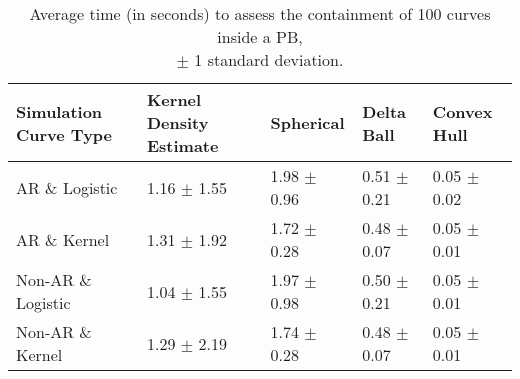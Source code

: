 \begin{table}[ht!]
\centering
\caption{Average time (in seconds) to assess the containment of 100 curves inside a PB, \\ \(\pm\) 1 standard deviation.} 
\label{tab:time_prediction100}
\begin{tabular}{R{1.4in}L{1.1in}L{.95in}L{.95in}L{.95in}}
  \hline
\hline
Simulation Curve Type & Kernel Density Estimate & Spherical & Delta Ball & Convex Hull \\ 
  \hline
AR \& Logistic & 1.16 \(\pm\) 1.55 & 1.98 \(\pm\) 0.96 & 0.51 \(\pm\) 0.21 & 0.05 \(\pm\) 0.02 \\ 
  AR \& Kernel & 1.31 \(\pm\) 1.92 & 1.72 \(\pm\) 0.28 & 0.48 \(\pm\) 0.07 & 0.05 \(\pm\) 0.01 \\ 
  Non-AR \& Logistic & 1.04 \(\pm\) 1.55 & 1.97 \(\pm\) 0.98 & 0.50 \(\pm\) 0.21 & 0.05 \(\pm\) 0.01 \\ 
  Non-AR \& Kernel & 1.29 \(\pm\) 2.19 & 1.74 \(\pm\) 0.28 & 0.48 \(\pm\) 0.07 & 0.05 \(\pm\) 0.01 \\ 
   \hline
\end{tabular}
\end{table}
